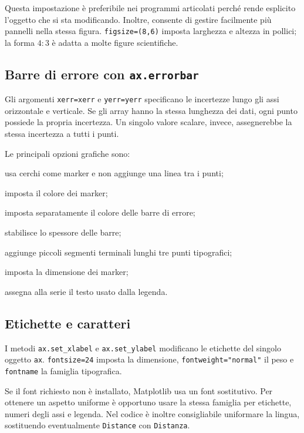 \documentclass[11pt,a4paper]{book}
\begin{document}
Questa impostazione è preferibile nei programmi articolati perché rende esplicito l'oggetto che si sta modificando. Inoltre, consente di gestire facilmente più pannelli nella stessa figura. \texttt{figsize=(8,6)} imposta larghezza e altezza in pollici; la forma $4:3$ è adatta a molte figure scientifiche.

\subsection{Barre di errore con \texttt{ax.errorbar}}
Gli argomenti \texttt{xerr=xerr} e \texttt{yerr=yerr} specificano le incertezze lungo gli assi orizzontale e verticale. Se gli array hanno la stessa lunghezza dei dati, ogni punto possiede la propria incertezza. Un singolo valore scalare, invece, assegnerebbe la stessa incertezza a tutti i punti.

Le principali opzioni grafiche sono:
\begin{description}[style=nextline]
  \item[\texttt{fmt="o"}] usa cerchi come marker e non aggiunge una linea tra i punti;
  \item[\texttt{color="blue"}] imposta il colore dei marker;
  \item[\texttt{ecolor="gray"}] imposta separatamente il colore delle barre di errore;
  \item[\texttt{elinewidth=1}] stabilisce lo spessore delle barre;
  \item[\texttt{capsize=3}] aggiunge piccoli segmenti terminali lunghi tre punti tipografici;
  \item[\texttt{markersize=5}] imposta la dimensione dei marker;
  \item[\texttt{label="Misura"}] assegna alla serie il testo usato dalla legenda.
\end{description}

\subsection{Etichette e caratteri}
I metodi \texttt{ax.set\_xlabel} e \texttt{ax.set\_ylabel} modificano le etichette del singolo oggetto \texttt{ax}. \texttt{fontsize=24} imposta la dimensione, \texttt{fontweight="normal"} il peso e \texttt{fontname} la famiglia tipografica.

Se il font richiesto non è installato, Matplotlib usa un font sostitutivo. Per ottenere un aspetto uniforme è opportuno usare la stessa famiglia per etichette, numeri degli assi e legenda. Nel codice è inoltre consigliabile uniformare la lingua, sostituendo eventualmente \texttt{Distance} con \texttt{Distanza}.
\end{document}
